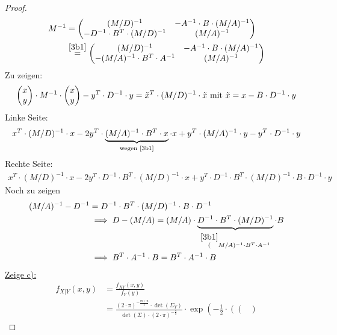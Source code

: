 \documentclass[12pt,a4paper]{article}
\begin{document}
\begin{proof}
\begin{align*}
M^{-1}
&=\begin{pmatrix}
(M/D)^{-1} & -A^{-1}\cdot B\cdot(M/A)^{-1}\\
-D^{-1}\cdot B^T\cdot(M/D)^{-1} & (M/A)^{-1}
\end{pmatrix}\\
&\stackeq{\eqref{3b1}}
\begin{pmatrix}
(M/D)^{-1} & -A^{-1}\cdot B\cdot(M/A)^{-1}\\
-(M/A)^{-1}\cdot B^T\cdot A^{-1} & (M/A)^{-1}
\end{pmatrix}
\end{align*}
Zu zeigen:
\begin{align*}
\begin{pmatrix}
x\\ y
\end{pmatrix}\cdot M^{-1}\cdot\begin{pmatrix}
x\\ y
\end{pmatrix}-y^T\cdot D^{-1}\cdot y=\tilde{x}^T\cdot (M/D)^{-1}\cdot\tilde{x}
\mit\tilde{x}=x-B\cdot D^{-1}\cdot y
\end{align*}
Linke Seite:
\begin{align*}
x^T\cdot(M/D)^{-1}\cdot x-2 y^T\cdot\underbrace{(M/A)^{-1}\cdot B^T\cdot x}_{\text{wegen \eqref{3b1}}}\cdot x+y^T\cdot(M/A)^{-1}\cdot y-y^T\cdot D^{-1}\cdot y
\end{align*}
Rechte Seite:
\begin{align*}
x^T\cdot(M/D)^{-1}\cdot x-2 y^T\cdot D^{-1}\cdot B^T\cdot(M/D)^{-1}\cdot x+y^T\cdot D^{-1}\cdot B^T\cdot(M/D)^{-1}\cdot B\cdot D^{-1}\cdot y
\end{align*}
Noch zu zeigen
\begin{align*}
(M/A)^{-1}-D^{-1}
&=D^{-1}\cdot B^T\cdot(M/D)^{-1}\cdot B\cdot D^{-1}\\
&\implies %
D-(M/A)=(M/A)\cdot\underbrace{ D^{-1}\cdot B^T\cdot(M/D)^{-1}}_{\stackrel{\eqref{3b1}}(M/A)^{-1}\cdot B^T\cdot A^{-1}}\cdot B
\\
&\implies
B^T\cdot A^{-1}\cdot B=B^T\cdot A^{-1}\cdot B
\end{align*}
\underline{Zeige c):}
\begin{align*}
f_{X|Y}(x,y)
&=\frac{f_{XY}(x,y)}{f_Y(y)}\\
&=\frac{(2\cdot\pi)^{-\frac{m+n}{2}}\cdot\det(\Sigma_Y)}{\det(\Sigma)\cdot(2\cdot\pi)^{-\frac{n}{2}}}
\cdot\exp\left(-\frac{1}{2}\cdot\left(\begin{pmatrix}

\end{pmatrix}
\end{align*}
\end{proof}
\end{document}

